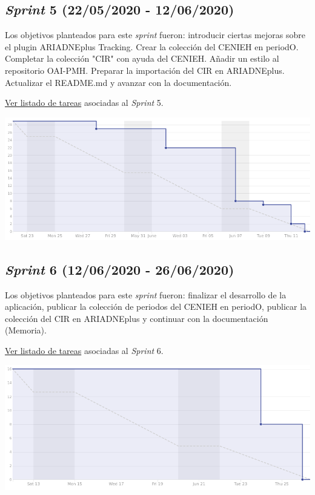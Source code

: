 \documentclass[
]{article}
\begin{document}
\hypertarget{sprint-5-22052020---12062020}{%
\subsection{\texorpdfstring{\emph{Sprint} 5 (22/05/2020 -
12/06/2020)}{Sprint 5 (22/05/2020 - 12/06/2020)}}\label{sprint-5-22052020---12062020}}

Los objetivos planteados para este \emph{sprint} fueron: introducir
ciertas mejoras sobre el plugin ARIADNEplus Tracking. Crear la colección
del CENIEH en periodO. Completar la colección "CIR" con ayuda del
CENIEH. Añadir un estilo al repositorio OAI-PMH. Preparar la importación
del CIR en ARIADNEplus. Actualizar el README.md y avanzar con la
documentación.

\href{https://github.com/gcm1001/TFG-CeniehAriadne/milestone/6}{Ver
listado de tareas} asociadas al \emph{Sprint} 5.

\includegraphics{../_static/images/sprint05.png}

\hypertarget{sprint-6-12062020---26062020}{%
\subsection{\texorpdfstring{\emph{Sprint} 6 (12/06/2020 -
26/06/2020)}{Sprint 6 (12/06/2020 - 26/06/2020)}}\label{sprint-6-12062020---26062020}}

Los objetivos planteados para este \emph{sprint} fueron: finalizar el
desarrollo de la aplicación, publicar la colección de periodos del
CENIEH en periodO, publicar la colección del CIR en ARIADNEplus y
continuar con la documentación (Memoria).

\href{https://github.com/gcm1001/TFG-CeniehAriadne/milestone/7}{Ver
listado de tareas} asociadas al \emph{Sprint} 6.

\includegraphics{../_static/images/sprint06.png}
\end{document}
